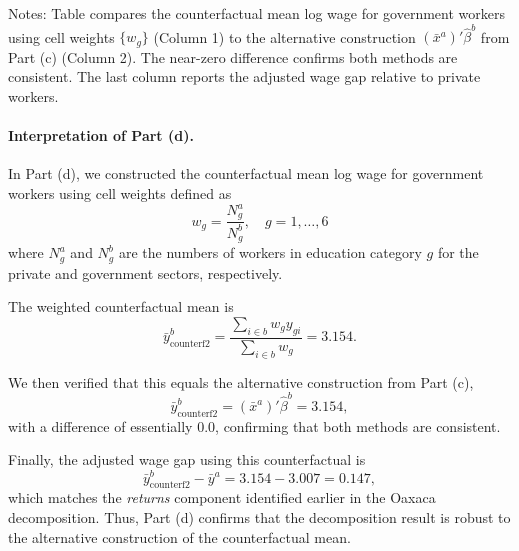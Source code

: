 \documentclass[12pt]{article}
\numberwithin{equation}{section}
\begin{document}
\begin{enumerate}[leftmargin=2em]
\begin{enumerate}[label=(\alph*),leftmargin=1.6em]
\begin{table}[H]
    \medskip
    \raggedright
    \footnotesize Notes: Table compares the counterfactual mean log wage for government workers using 
    cell weights $\{w_g\}$ (Column 1) to the alternative construction $(\bar{x}^a)'\hat{\beta}^b$ from Part (c) (Column 2). 
    The near-zero difference confirms both methods are consistent. The last column reports the adjusted wage gap relative to private workers. 
    \end{table}
    
    \paragraph{Interpretation of Part (d).}
    In Part (d), we constructed the counterfactual mean log wage for government workers using 
    cell weights defined as
    \[
      w_g = \frac{N_g^a}{N_g^b}, \quad g=1,\dots,6
    \]
    where $N_g^a$ and $N_g^b$ are the numbers of workers in education category $g$ for the private and government sectors, respectively. 
    
    The weighted counterfactual mean is
    \[
      \bar{y}^b_{\text{counterf2}} = \frac{\sum_{i \in b} w_g y_{gi}}{\sum_{i \in b} w_g} = 3.154.
    \]
    
    We then verified that this equals the alternative construction from Part (c),
    \[
      \bar{y}^b_{\text{counterf2}} = (\bar{x}^a)'\hat{\beta}^b = 3.154,
    \]
    with a difference of essentially $0.0$, confirming that both methods are consistent.
    
    Finally, the adjusted wage gap using this counterfactual is
    \[
      \bar{y}^b_{\text{counterf2}} - \bar{y}^a = 3.154 - 3.007 = 0.147,
    \]
    which matches the \emph{returns} component identified earlier in the Oaxaca decomposition. Thus, Part (d) confirms that the decomposition result is robust to the alternative construction of the counterfactual mean.
    
    \end{enumerate}

\end{enumerate}
\end{document}

